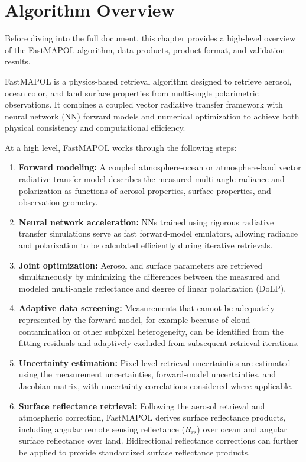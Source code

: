 \documentclass[
  11pt,
  letterpaper,
  DIV=11,
  numbers=noendperiod]{scrreprt}
\begin{document}
\chapter{Algorithm Overview}\label{algorithm-overview}

Before diving into the full document, this chapter provides a high-level
overview of the FastMAPOL algorithm, data products, product format, and
validation results.

FastMAPOL is a physics-based retrieval algorithm designed to retrieve
aerosol, ocean color, and land surface properties from multi-angle
polarimetric observations. It combines a coupled vector radiative
transfer framework with neural network (NN) forward models and numerical
optimization to achieve both physical consistency and computational
efficiency.

At a high level, FastMAPOL works through the following steps:

\begin{enumerate}
\def\labelenumi{\arabic{enumi}.}
\item
  \textbf{Forward modeling:} A coupled atmosphere-ocean or
  atmosphere-land vector radiative transfer model describes the measured
  multi-angle radiance and polarization as functions of aerosol
  properties, surface properties, and observation geometry.
\item
  \textbf{Neural network acceleration:} NNs trained using rigorous
  radiative transfer simulations serve as fast forward-model emulators,
  allowing radiance and polarization to be calculated efficiently during
  iterative retrievals.
\item
  \textbf{Joint optimization:} Aerosol and surface parameters are
  retrieved simultaneously by minimizing the differences between the
  measured and modeled multi-angle reflectance and degree of linear
  polarization (DoLP).
\item
  \textbf{Adaptive data screening:} Measurements that cannot be
  adequately represented by the forward model, for example because of
  cloud contamination or other subpixel heterogeneity, can be identified
  from the fitting residuals and adaptively excluded from subsequent
  retrieval iterations.
\item
  \textbf{Uncertainty estimation:} Pixel-level retrieval uncertainties
  are estimated using the measurement uncertainties, forward-model
  uncertainties, and Jacobian matrix, with uncertainty correlations
  considered where applicable.
\item
  \textbf{Surface reflectance retrieval:} Following the aerosol
  retrieval and atmospheric correction, FastMAPOL derives surface
  reflectance products, including angular remote sensing reflectance
  (\(R_{rs}\)) over ocean and angular surface reflectance over land.
  Bidirectional reflectance corrections can further be applied to
  provide standardized surface reflectance products.
\end{enumerate}
\end{document}
